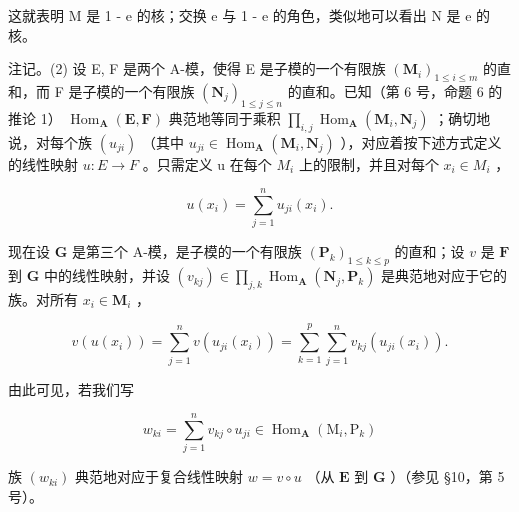 这就表明 M 是 1 - e 的核；交换 e 与 1 - e 的角色，类似地可以看出 N 是 e 的核。

注记。(2) 设 E, F 是两个 A-模，使得 E 是子模的一个有限族 \((\mathbf{M}_{i})_{1\leqslant i\leqslant m}\) 的直和，而 F 是子模的一个有限族 \((\mathbf{N}_{j})_{1\leqslant j\leqslant n}\) 的直和。已知（第 6 号，命题 6 的推论 1） \(\operatorname{Hom}_{\mathbf{A}}(\mathbf{E},\mathbf{F})\) 典范地等同于乘积 \(\prod_{i,j}\operatorname{Hom}_{\mathbf{A}}(\mathbf{M}_{i},\mathbf{N}_{j})\) ；确切地说，对每个族 \((u_{ji})\) （其中 \(u_{ji}\in\operatorname{Hom}_{\mathbf{A}}(\mathbf{M}_{i},\mathbf{N}_{j})\) ），对应着按下述方式定义的线性映射 \(u:E\to F\) 。只需定义 u 在每个 \(M_{i}\) 上的限制，并且对每个 \(x_{i}\in M_{i}\) ，

\[
u (x _ {i}) = \sum_ {j = 1} ^ {n} u _ {j i} (x _ {i}).
\]

现在设 \(\mathbf{G}\) 是第三个 A-模，是子模的一个有限族 \((\mathbf{P}_k)_{1 \leqslant k \leqslant p}\) 的直和；设 \(v\) 是 \(\mathbf{F}\) 到 \(\mathbf{G}\) 中的线性映射，并设 \((v_{kj}) \in \prod_{j,k} \operatorname{Hom}_{\mathbf{A}}(\mathbf{N}_j, \mathbf{P}_k)\) 是典范地对应于它的族。对所有 \(x_i \in \mathbf{M}_i\) ，

\[
v (u (x _ {i})) = \sum_ {j = 1} ^ {n} v (u _ {j i} (x _ {i})) = \sum_ {k = 1} ^ {p} \sum_ {j = 1} ^ {n} v _ {k j} (u _ {j i} (x _ {i})).
\]

由此可见，若我们写

\[
w _ {k i} = \sum_ {j = 1} ^ {n} v _ {k j} \circ u _ {j i} \in \operatorname{Hom} _ {\mathbf {A}} (\mathrm{M} _ {i}, \mathrm{P} _ {k})\tag{32}
\]

族 \((w_{ki})\) 典范地对应于复合线性映射 \(w = v \circ u\) （从 \(\mathbf{E}\) 到 \(\mathbf{G}\) ）（参见 §10，第 5 号）。

